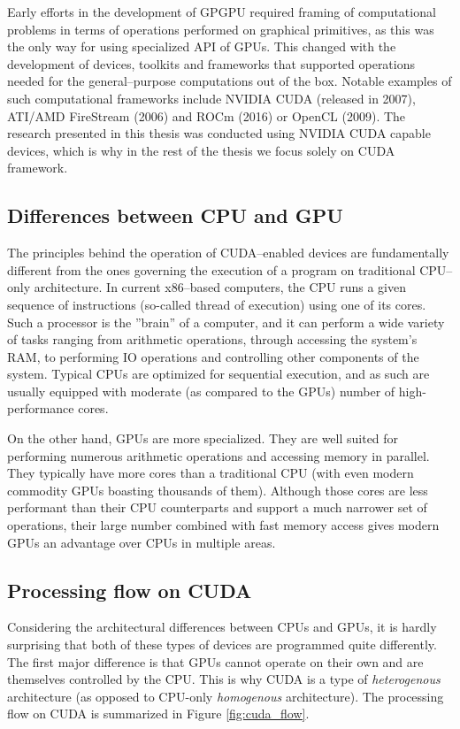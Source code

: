 Early efforts in the development of GPGPU required framing of computational problems in terms of
operations performed on graphical primitives, as this was the only way for using specialized API of
GPUs. This changed with the development of devices, toolkits and frameworks that supported operations needed for
the general--purpose computations out of the box. Notable examples of such computational frameworks include NVIDIA CUDA \cite{CUDAguide, CUDAvsOpenCL, CUDAExperience} (released in 2007), ATI/AMD FireStream \cite{firestream1,firestream2} (2006) and ROCm \cite{ROCm1,ROCm2,ROCm3} (2016) or OpenCL \cite{CUDAvsOpenCL} (2009). The research presented in this thesis was conducted using NVIDIA CUDA capable devices, which is why in the rest of the thesis we focus solely on CUDA framework.

\subsection{Differences between CPU and GPU}
The principles behind the operation of CUDA--enabled devices are fundamentally different from the
ones governing the execution of a program on traditional CPU--only architecture. In current
x86--based computers, the CPU runs a given sequence of instructions (so-called thread of execution)
using one of its cores. Such a processor is the ''brain'' of a computer, and it can perform a wide
variety of tasks ranging from arithmetic operations, through accessing the system's RAM, to
performing IO operations and controlling other components of the system. Typical CPUs are optimized
for sequential execution, and as such are usually equipped with moderate (as compared to the GPUs)
number of high-performance cores.

On the other hand, GPUs are more specialized. They are well suited for performing numerous
arithmetic operations and accessing memory in parallel. They typically have more cores than a
traditional CPU (with even modern commodity GPUs boasting thousands of them). Although those cores
are less performant than their CPU counterparts and support a much narrower set of operations, their
large number combined with fast memory access gives modern GPUs an advantage over CPUs in multiple
areas.

\subsection{Processing flow on CUDA}
Considering the architectural differences between CPUs and GPUs, it is hardly surprising that both
of these types of devices are programmed quite differently. The first major difference is that GPUs
cannot operate on their own and are themselves controlled by the CPU. This is why CUDA is a type of
\emph{heterogenous} architecture (as opposed to CPU-only \emph{homogenous} architecture). The
processing flow on CUDA is summarized in Figure \ref{fig:cuda_flow}.

